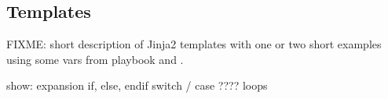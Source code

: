 \subsection*{Templates}

FIXME: short description of Jinja2 templates with one or two short examples using some vars from playbook and .

show:
        expansion
	        if, else, endif
		        switch / case ????
			        loops
